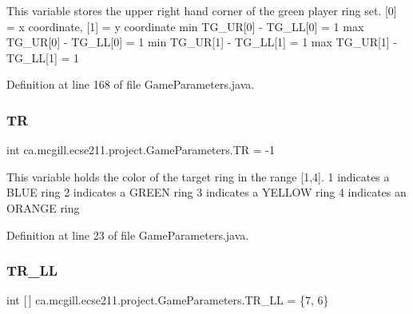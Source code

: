This variable stores the upper right hand corner of the green player ring set. \mbox{[}0\mbox{]} = x coordinate, \mbox{[}1\mbox{]} = y coordinate min T\+G\+\_\+\+UR\mbox{[}0\mbox{]} -\/ T\+G\+\_\+\+LL\mbox{[}0\mbox{]} = 1 max T\+G\+\_\+\+UR\mbox{[}0\mbox{]} -\/ T\+G\+\_\+\+LL\mbox{[}0\mbox{]} = 1 min T\+G\+\_\+\+UR\mbox{[}1\mbox{]} -\/ T\+G\+\_\+\+LL\mbox{[}1\mbox{]} = 1 max T\+G\+\_\+\+UR\mbox{[}1\mbox{]} -\/ T\+G\+\_\+\+LL\mbox{[}1\mbox{]} = 1 

Definition at line 168 of file Game\+Parameters.\+java.

\mbox{\label{classca_1_1mcgill_1_1ecse211_1_1project_1_1_game_parameters_a5a299e93e098c89d12be1072947d3bcb}} 
\subsubsection{\texorpdfstring{TR}{TR}}
{\footnotesize\ttfamily int ca.\+mcgill.\+ecse211.\+project.\+Game\+Parameters.\+TR = -\/1\hspace{0.3cm}{\ttfamily [static]}}

This variable holds the color of the target ring in the range \mbox{[}1,4\mbox{]}. 1 indicates a B\+L\+UE ring 2 indicates a G\+R\+E\+EN ring 3 indicates a Y\+E\+L\+L\+OW ring 4 indicates an O\+R\+A\+N\+GE ring 

Definition at line 23 of file Game\+Parameters.\+java.

\mbox{\label{classca_1_1mcgill_1_1ecse211_1_1project_1_1_game_parameters_ac642730053a35524ce70866289ca10b9}} 
\subsubsection{\texorpdfstring{T\+R\+\_\+\+LL}{TR\_LL}}
{\footnotesize\ttfamily int \mbox{[}$\,$\mbox{]} ca.\+mcgill.\+ecse211.\+project.\+Game\+Parameters.\+T\+R\+\_\+\+LL = \{7, 6\}\hspace{0.3cm}{\ttfamily [static]}}

